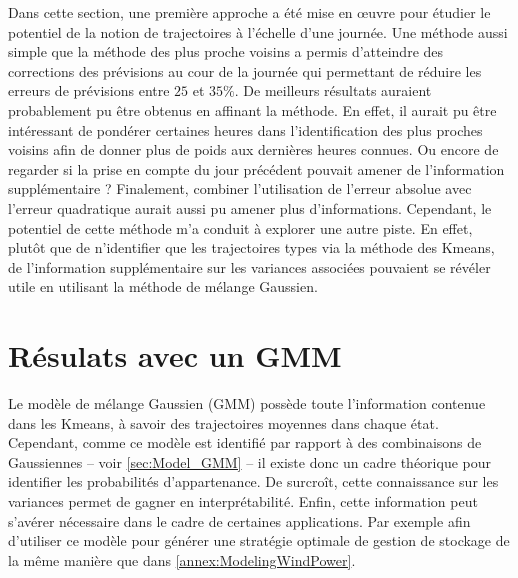 \documentclass[12pt]{report}
\begin{document}
Dans cette section, une première approche a été mise en œuvre pour étudier le potentiel de la notion de trajectoires à l'échelle d'une journée. Une méthode aussi simple que la méthode des plus proche voisins a permis d'atteindre des corrections des prévisions au cour de la journée qui permettant de réduire les erreurs de prévisions entre $25$ et $35\%$. De meilleurs résultats auraient probablement pu être obtenus en affinant la méthode. En effet, il aurait pu être intéressant de pondérer certaines heures dans l'identification des plus proches voisins afin de donner plus de poids aux dernières heures connues. Ou encore de regarder si la prise en compte du jour précédent pouvait amener de l'information supplémentaire ? Finalement, combiner l'utilisation de l'erreur absolue avec l'erreur quadratique aurait aussi pu amener plus d'informations. Cependant, le potentiel de cette méthode m'a conduit à explorer une autre piste. En effet, plutôt que de n'identifier que les trajectoires types via la méthode des Kmeans, de l'information supplémentaire sur les variances associées pouvaient se révéler utile en utilisant la méthode de mélange Gaussien.


\section{Résulats avec un GMM}
\label{sec:PV_GMM}
Le modèle de mélange Gaussien (GMM) possède toute l'information contenue dans les Kmeans, à savoir des trajectoires moyennes dans chaque état. Cependant, comme ce modèle est identifié par rapport à des combinaisons de Gaussiennes -- voir \ref{sec:Model_GMM} -- il existe donc un cadre théorique pour identifier les probabilités d'appartenance. De surcroît, cette connaissance sur les variances permet de gagner en interprétabilité. Enfin, cette information peut s'avérer nécessaire dans le cadre de certaines applications. Par exemple afin d'utiliser ce modèle pour générer une stratégie optimale de gestion de stockage de la même manière que dans \ref{annex:ModelingWindPower}.
\end{document}
